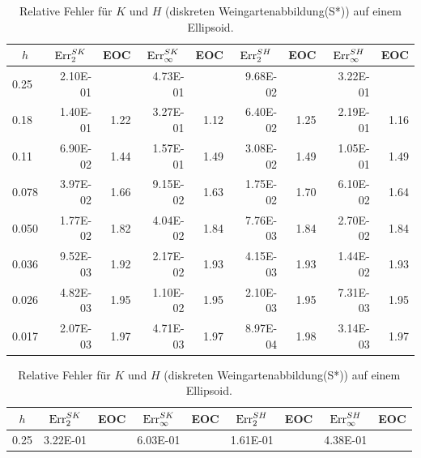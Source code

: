    \begin{table}[htbp]
      \begin{tabular}{|l|r|r|r|r|r|r|r|r|}
      \hline
      \multicolumn{1}{|c|}{\rule{0pt}{11pt}\( h \)} & \multicolumn{1}{c|}{\( \text{Err}_{2}^{SK} \)} & \multicolumn{1}{c|}{EOC} & 
           \multicolumn{1}{c|}{\( \text{Err}_{\infty}^{SK} \)} & \multicolumn{1}{c|}{EOC} & \multicolumn{1}{c|}{\( \text{Err}_{2}^{SH} \)} &
           \multicolumn{1}{c|}{EOC} & \multicolumn{1}{c|}{\( \text{Err}_{\infty}^{SH} \)} & \multicolumn{1}{c|}{EOC} \\ \hline
           0.25 & 2.10E-01 & \multicolumn{1}{l|}{} & 4.73E-01 & \multicolumn{1}{l|}{} & 9.68E-02 & \multicolumn{1}{l|}{} & 3.22E-01 & \multicolumn{1}{l|}{} \\ \hline
            0.18 & 1.40E-01 & 1.22 & 3.27E-01 & 1.12 & 6.40E-02 & 1.25 & 2.19E-01 & 1.16 \\ \hline
            0.11 & 6.90E-02 & 1.44 & 1.57E-01 & 1.49 & 3.08E-02 & 1.49 & 1.05E-01 & 1.49 \\ \hline
            0.078 & 3.97E-02 & 1.66 & 9.15E-02 & 1.63 & 1.75E-02 & 1.70 & 6.10E-02 & 1.64 \\ \hline
            0.050 & 1.77E-02 & 1.82 & 4.04E-02 & 1.84 & 7.76E-03 & 1.84 & 2.70E-02 & 1.84 \\ \hline
            0.036 & 9.52E-03 & 1.92 & 2.17E-02 & 1.93 & 4.15E-03 & 1.93 & 1.44E-02 & 1.93 \\ \hline
            0.026 & 4.82E-03 & 1.95 & 1.10E-02 & 1.95 & 2.10E-03 & 1.95 & 7.31E-03 & 1.95 \\ \hline
            0.017 & 2.07E-03 & 1.97 & 4.71E-03 & 1.97 & 8.97E-04 & 1.98 & 3.14E-03 & 1.97 \\ \hline
      \end{tabular}
      \caption[Weingarten auf einem Ellipsoid]{Relative Fehler für \( K \) und \( H \) (diskreten Weingartenabbildung(S*)) auf einem Ellipsoid.}
      \label{tabHeineCWeingarten}
      \vspace{10pt}
      \begin{tabular}{|l|r|r|r|r|r|r|r|r|}
      \hline
      \multicolumn{1}{|c|}{\rule{0pt}{11pt}\( h \)} & \multicolumn{1}{c|}{\( \text{Err}_{2}^{SK} \)} & \multicolumn{1}{c|}{EOC} & 
           \multicolumn{1}{c|}{\( \text{Err}_{\infty}^{SK} \)} & \multicolumn{1}{c|}{EOC} & \multicolumn{1}{c|}{\( \text{Err}_{2}^{SH} \)} &
           \multicolumn{1}{c|}{EOC} & \multicolumn{1}{c|}{\( \text{Err}_{\infty}^{SH} \)} & \multicolumn{1}{c|}{EOC} \\ \hline
           0.25 & 3.22E-01 & \multicolumn{1}{l|}{} & 6.03E-01 & \multicolumn{1}{l|}{} & 1.61E-01 & \multicolumn{1}{l|}{} & 4.38E-01 & \multicolumn{1}{l|}{} \\ \hline

\end{tabular}
\end{table}
